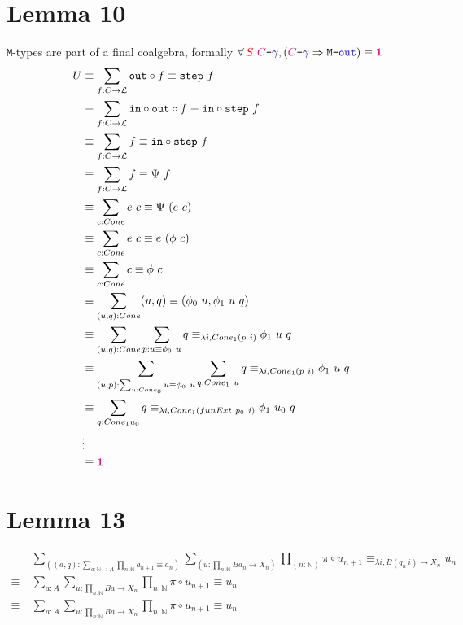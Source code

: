\documentclass[twoside,11pt,openright]{report}
\newcommand*{\term}[1]{\textcolor{blue!80!black}{#1}}
\newcommand*{\type}[1]{\textcolor{magenta!90!black}{#1}}
\newcommand*{\container}[1]{\textcolor{red}{#1}}
\newcommand*{\unit}{\type{\textbf{1}}}
\newcommand*{\coalg}[2]{#1\texttt{-}#2}
\newcommand*{\typeformer}[1]{\mathtt{#1}}
\begin{document}
\section{Lemma 10}
\texttt{M}-types are part of a final coalgebra, formally \(\forall\,\container{S}~\coalg{\type{C}}{\term{\gamma}}, (\coalg{\type{C}}{\term{\gamma}} \Rightarrow \coalg{\typeformer{M}}{\term{\mathtt{out}}}) \equiv \unit\)
\begin{align}
  U &\equiv \sum_{f : C \rightarrow \mathcal{L}} \mathtt{out} \circ f \equiv \mathtt{step}~f \\
    &\equiv \sum_{f : C \rightarrow \mathcal{L}} \mathtt{in} \circ \mathtt{out} \circ f \equiv \mathtt{in} \circ \mathtt{step}~f\\
    &\equiv \sum_{f : C \rightarrow \mathcal{L}} f \equiv \mathtt{in} \circ \mathtt{step}~f\\
    &\equiv \sum_{f : C \rightarrow \mathcal{L}} f \equiv \Psi~f\\
    &\equiv \sum_{c : Cone} e~c \equiv \Psi~(e~c)\\
    &\equiv \sum_{c : Cone} e~c \equiv e~(\phi~c) \\
    &\equiv \sum_{c : Cone} c \equiv \phi~c \\
    &\equiv \sum_{(u,q) : Cone} (u , q) \equiv (\phi_0~u , \phi_1~u~q) \\
    &\equiv \sum_{(u,q) : Cone} \sum_{p : u \equiv \phi_0~u} q \equiv_{\lambda i, Cone_1 (p~i)} \phi_1~u~q \\
    &\equiv \sum_{(u,p) : \sum_{u : Cone_0} u \equiv \phi_0~u} \sum_{q : Cone_1~u} q \equiv_{\lambda i, Cone_1 (p~i)} \phi_1~u~q \\
    &\equiv \sum_{q : Cone_1 u_0} q \equiv_{\lambda i, Cone_1 (funExt~p_0~i)} \phi_1~u_0~q \\
    &\vdots \\
    &\equiv \unit
\end{align}

\section{Lemma 13}
\begin{align}
  &~\sum_{((a,q):\sum_{a : \mathbb{N} \rightarrow A} \prod_{n : \mathbb{N}} a_{n+1} \equiv a_n)} \sum_{(u : \prod_{n : \mathbb{N}} B a_n \rightarrow X_n)} \prod_{(n : \mathbb{N})} \pi \circ u_{n + 1} \equiv_{\lambda i, B (q_n~i) \rightarrow X_n} u_n \\
  \equiv&~\sum_{a : A} \sum_{u : \prod_{n : \mathbb{N}} B a \rightarrow X_n} \prod_{n : \mathbb{N}} \pi \circ u_{n+1} \equiv u_n \\
  \equiv&~\sum_{a : A} \sum_{u : \prod_{n : \mathbb{N}} B a \rightarrow X_n} \prod_{n : \mathbb{N}} \pi \circ u_{n+1} \equiv u_n
\end{align}
\end{document}
